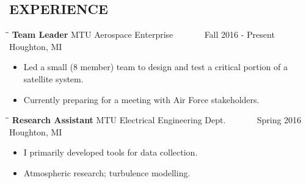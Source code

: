 \documentclass[letterpaper]{res}
\begin{document}
\begin{resume}

  \section{EXPERIENCE}
  \vspace{-0.15in}
  \begin{tabbing}
    \hspace{2.3in}\= \hspace{2.6in}\= \kill %
    {\bf Team Leader} \>MTU Aerospace Enterprise \> ~~~~~~ Fall 2016 - Present\\
    \>Houghton, MI
  \end{tabbing}\vspace{-10pt}
  \begin{itemize} \itemsep1pt \parskip0pt 
    \item Led a small (8 member) team to design and test a critical portion of a satellite system.
    \item Currently preparing for a meeting with Air Force stakeholders.
  \end{itemize}

  \vspace{-0.15in}
  \begin{tabbing}
    \hspace{2.3in}\= \hspace{2.6in}\= \kill %
    {\bf Research Assistant} \>MTU Electrical Engineering Dept. \> ~~~~~~ Spring 2016\\
    \>Houghton, MI
  \end{tabbing}\vspace{-10pt}
  \begin{itemize} \itemsep1pt \parskip0pt 
    \item I primarily developed tools for data collection.
    \item Atmospheric research; turbulence modelling.
  \end{itemize}


\end{resume}
\end{document}
